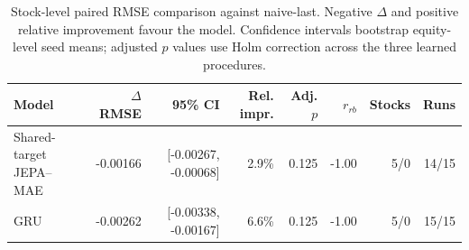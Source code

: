 \begin{table}[t]
\centering
\small
\caption{Stock-level paired RMSE comparison against naive-last. Negative $\Delta$ and positive relative improvement favour the model. Confidence intervals bootstrap equity-level seed means; adjusted $p$ values use Holm correction across the three learned procedures.}
\label{tab:paired_rmse_naive}
\begin{tabular}{lrrrrrrr}
\toprule
Model & $\Delta$RMSE & 95\% CI & Rel. impr. & Adj. $p$ & $r_{rb}$ & Stocks & Runs \\
\midrule
Shared-target JEPA--MAE & -0.00166 & [-0.00267, -0.00068] & 2.9\% & 0.125 & -1.00 & 5/0 & 14/15 \\
GRU & -0.00262 & [-0.00338, -0.00167] & 6.6\% & 0.125 & -1.00 & 5/0 & 15/15 \\
\bottomrule
\end{tabular}
\end{table}

